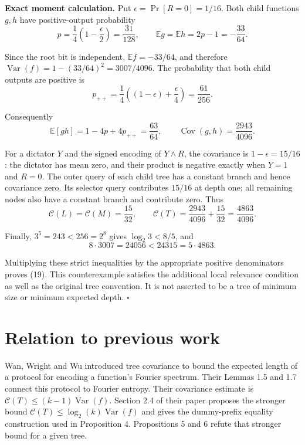 \documentclass[
  american,
  11pt,
]{article}
\begin{document}
\textbf{Exact moment calculation.} Put \(\epsilon=\Pr[R=0]=1/16\). Both
child functions \(g,h\) have positive-output probability \[
p=\frac14\left(1-\frac\epsilon2\right)=\frac{31}{128},
\qquad \mathbb E g=\mathbb E h=2p-1=-\frac{33}{64}.
\]

Since the root bit is independent, \(\mathbb E f=-33/64\), and therefore
\(\operatorname{Var}(f)=1-(33/64)^2=3007/4096\). The probability that
both child outputs are positive is \[
p_{++}=\frac14\left((1-\epsilon)+\frac\epsilon4\right)=\frac{61}{256}.
\]

Consequently \[
\mathbb E[gh]=1-4p+4p_{++}=\frac{63}{64},\qquad
\operatorname{Cov}(g,h)=\frac{2943}{4096}.
\]

For a dictator \(Y\) and the signed encoding of \(Y\land R\), the
covariance is \(1-\epsilon=15/16\): the dictator has mean zero, and
their product is negative exactly when \(Y=1\) and \(R=0\). The outer
query of each child tree has a constant branch and hence covariance
zero. Its selector query contributes \(15/16\) at depth one; all
remaining nodes also have a constant branch and contribute zero. Thus \[
\mathcal C(L)=\mathcal C(M)=\frac{15}{32},\qquad
\mathcal C(T)=\frac{2943}{4096}+\frac{15}{32}=\frac{4863}{4096}.
\]

Finally, \(3^5=243<256=2^8\) gives \(\log_2 3<8/5\), and \[
8\cdot3007=24056<24315=5\cdot4863.
\]

Multiplying these strict inequalities by the appropriate positive
denominators proves (19). This counterexample satisfies the additional
local relevance condition as well as the original tree convention. It is
not asserted to be a tree of minimum size or minimum expected depth.
\(\square\)

\section{Relation to previous work}\label{relation-to-previous-work}

Wan, Wright and Wu introduced tree covariance to bound the expected
length of a protocol for encoding a function's Fourier spectrum. Their
Lemmas 1.5 and 1.7 connect this protocol to Fourier entropy. Their
covariance estimate is \(\mathcal C(T)\leq(k-1)\operatorname{Var}(f)\).
Section 2.4 of their paper proposes the stronger bound
\(\mathcal C(T)\leq\log_2(k)\operatorname{Var}(f)\) and gives the
dummy-prefix equality construction used in Proposition 4. Propositions 5
and 6 refute that stronger bound for a given tree.
\end{document}
